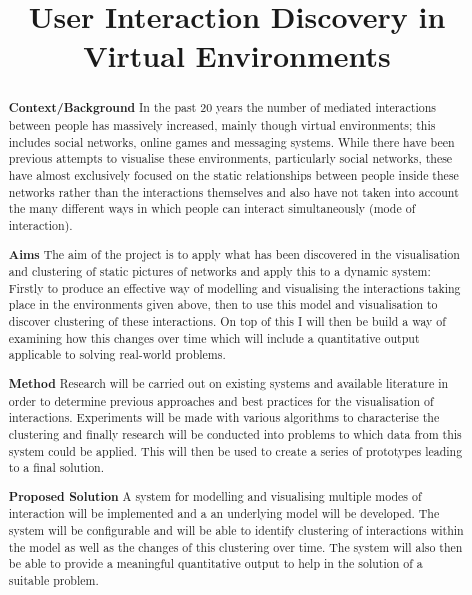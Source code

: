 \documentclass[12pt,a4paper]{article}
\title{User Interaction Discovery in Virtual Environments}
\date{}
\begin{document}
\maketitle

\begin{abstract}

{\bf Context/Background}
In the past 20 years the number of mediated interactions between people has massively increased, mainly though virtual environments; this includes social networks, online games and messaging systems. While there have been previous attempts to visualise these environments, particularly social networks, these have almost exclusively focused on the static relationships between people inside these networks rather than the interactions themselves and also have not taken into account the many different ways in which people can interact simultaneously (mode of interaction).

{\bf Aims}
The aim of the project is to apply what has been discovered in the visualisation and clustering of static pictures of networks and apply this to a dynamic system:  Firstly to produce an effective way of modelling and visualising the interactions taking place in the environments given above, then to use this model and visualisation to discover clustering of these interactions. On top of this I will then be build a way of examining how this changes over time which will include a quantitative output applicable to solving real-world problems.

{\bf Method}
Research will be carried out on existing systems and available literature in order to determine previous approaches and best practices for the visualisation of interactions. Experiments will be made with various algorithms to characterise the clustering and finally research will be conducted into problems to which data from this system could be applied. This will then be used to create a series of prototypes leading to a final solution.

{\bf Proposed Solution}
A system for modelling and visualising multiple modes of interaction will be implemented and a an underlying model will be developed. The system will be configurable and will be able to identify clustering of interactions within the model as well as the changes of this clustering over time. The system will also then be able to provide a meaningful quantitative output to help in the solution of a suitable problem.

\end{abstract}
\end{document}
